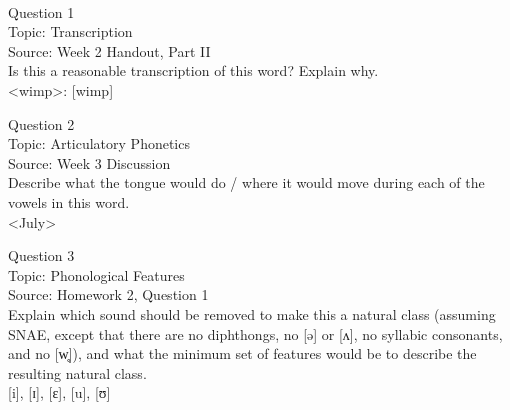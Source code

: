 \documentclass[12pt]{article}
\begin{document}
\newpage

\begin{center}
\textbf{{\color{red}{\HUGE END OF EXAM}}}\\

\end{center}
\newpage

\begin{center}
\textbf{{\color{blue}{\HUGE START OF EXAM\\}}}

\textbf{{\color{blue}{\HUGE Student ID: 81020\\}}}

\textbf{{\color{blue}{\HUGE \\}}}

\end{center}
\newpage

{\large Question 1}\\

Topic: Transcription\\
Source: Week 2 Handout, Part II\\

Is this a reasonable transcription of this word? Explain why.\\

<wimp>: {[wimp]}


\newpage

{\large Question 2}\\

Topic: Articulatory Phonetics\\
Source: Week 3 Discussion\\

Describe what the tongue would do / where it would move during each of the vowels in this word.\\

<July>


\newpage

{\large Question 3}\\

Topic: Phonological Features\\
Source: Homework 2, Question 1\\

Explain which sound should be removed to make this a natural class (assuming SNAE, except that there are no diphthongs, no [ə] or [ʌ], no syllabic consonants, and no [w̥]), and what the minimum set of features would be to describe the resulting natural class.\\

{[i]}, {[ɪ]}, {[ɛ]}, {[u]}, {[ʊ]}
\end{document}
